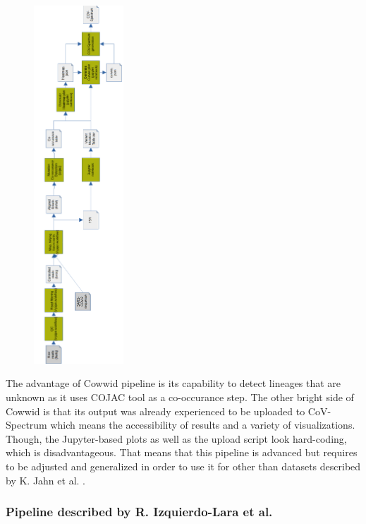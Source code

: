         \begin{figure}[h]
        	\centering
            \includegraphics[width=0.3\textwidth]{figures/prior/cowwid_vertical.png}
            \label{fig:prior:cowwid}
        \end{figure}
        
        The advantage of Cowwid pipeline is its capability to detect lineages that are unknown as it uses COJAC tool as a co-occurance step. The other bright side of Cowwid is that its output was already experienced to be uploaded to CoV-Spectrum which means the accessibility of results and a variety of visualizations. Though, the Jupyter-based plots as well as the upload script look hard-coding, which is disadvantageous. That means that this pipeline is advanced but requires to be adjusted and generalized in order to use it for other than datasets described by K. Jahn et al. \cite{jahn2022}. 
        
        \subsubsection{Pipeline described by R. Izquierdo-Lara et al.}
        
